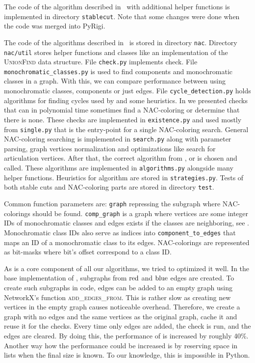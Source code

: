 The code of the algorithm described in~
with additional helper functions is implemented in directory \texttt{stablecut}.
Note that some changes were done when the code was merged into PyRigi.

The code of the algorithms described in~
is stored in directory \texttt{nac}.
%
Directory \texttt{nac/util} stores helper functions and classes
like an implementation of the \textsc{UnionFind} data structure.
%
File \texttt{check.py} implements \IsNACColoring{} check.
%
File \texttt{monochromatic\_classes.py} is used to find \trcon{} components
and monochromatic classes in a graph. With this, we can compare performance
between using monochromatic classes, \trcon{} components or just edges.
%
File \texttt{cycle\_detection.py} holds algorithms for finding cycles
used by 
and some heuristics.
%
In 
we presented checks that can in polynomial time
sometimes find a NAC-coloring or determine that there is none.
These checks are implemented in \texttt{existence.py} and
used mostly from \texttt{single.py} that is the entry-point
for a single NAC-coloring search.
%
General NAC-coloring searching is implemented in \texttt{search.py}
along with parameter parsing, graph vertices normalization and
optimizations like search for articulation vertices.
After that, the correct algorithm from \Naive{}, \NaiveCycles{} or \Subgraphs{}
is chosen and called.
%
These algorithms are implemented in \texttt{algorithms.py} alongside many helper functions.
Heuristics for \Subgraphs{} algorithm are stored in \texttt{strategies.py}.
%
Tests of both stable cuts and NAC-coloring parts are stored in directory \texttt{test}.

Common function parameters are:
\texttt{graph} repressing the subgraph where NAC-colorings should be found.
%
\texttt{comp\_graph} is a graph where vertices are some integer IDs of monochromatic classes
and edges exists if the classes are neighboring,
see .
%
Monochromatic class IDs also serve as indices into \texttt{component\_to\_edges}
that maps an ID of a monochromatic class to its edges.
%
NAC-colorings are represented as bit-masks where bit's offset correspond to a class ID\@.

As \IsNACColoring{} is a core component of all our algorithms,
we tried to optimized it well.
%
In the base implementation of \IsNACColoring{},
subgraphs from \( \text{red} \) and \( \text{blue} \) edges are created.
To create such subgraphs in code, edges can be added to an empty graph
using NetworkX's function \textsc{add\_edges\_from}.
%
This is rather slow as creating new vertices in the empty graph causes noticeable overhead.
Therefore, we create a graph with no edges and the same vertices as the original graph,
cache it and reuse it for the checks.
Every time only edges are added, the check is run, and the edges are cleared.
By doing this, the performance of \IsNACColoring{} is increased by roughly 40\%.
%
Another way how the performance could be increased is by reserving space in lists
when the final size is known.
To our knowledge, this is impossible in Python.

